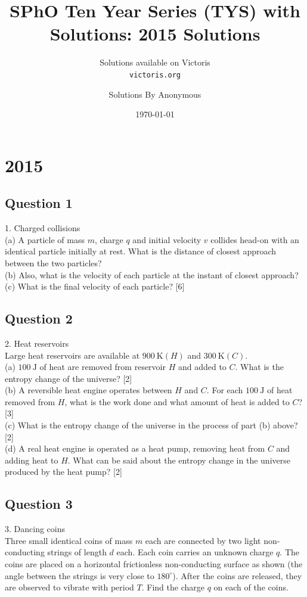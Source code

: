 \documentclass{article}
\title{SPhO Ten Year Series (TYS) with Solutions: 2015 Solutions}
\author{
    Solutions available on Victoris\\
    \texttt{victoris.org}
    \and 
    Solutions By Anonymous
}
\date{\today}
\begin{document}
\maketitle

\section{2015}

\subsection{Question 1}
1. Charged collisions \\
(a) A particle of mass $m$, charge $q$ and initial velocity $v$ collides head-on with an identical particle initially at rest. What is the distance of closest approach between the two particles? \\
(b) Also, what is the velocity of each particle at the instant of closest approach? \\
(c) What is the final velocity of each particle? [6]

\subsection{Question 2}
2. Heat reservoirs \\
Large heat reservoirs are available at $900 \mathrm{~K}(H)$ and $300 \mathrm{~K}(C)$. \\
(a) $100 \mathrm{~J}$ of heat are removed from reservoir $H$ and added to $C .$ What is the entropy change of the universe? [2] \\
(b) A reversible heat engine operates between $H$ and $C .$ For each $100 \mathrm{~J}$ of heat removed from $H$, what is the work done and what amount of heat is added to $C$? [3] \\
(c) What is the entropy change of the universe in the process of part (b) above? [2] \\
(d) A real heat engine is operated as a heat pump, removing heat from $C$ and adding heat to $H .$ What can be said about the entropy change in the universe produced by the heat pump? [2]

\subsection{Question 3}
3. Dancing coins \\
Three small identical coins of mass $m$ each are connected by two light non-conducting strings of length $d$ each. Each coin carries an unknown charge $q$. The coins are placed on a horizontal frictionless non-conducting surface as shown (the angle between the strings is very close to $180^{\circ}$). After the coins are released, they are observed to vibrate with period $T$. Find the charge $q$ on each of the coins.
\end{document}
